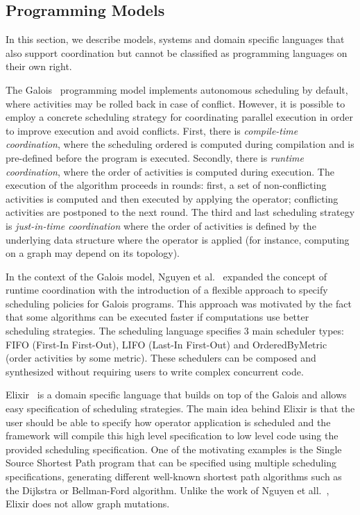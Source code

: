 \subsection{Programming Models}

In this section, we describe models, systems and domain specific languages that
also support coordination but cannot be classified as programming languages on
their own right.

The Galois~\cite{Pingali:2011:TPA:1993316.1993501} programming model implements
autonomous scheduling by default, where activities may be rolled back in case of
conflict. However, it is possible to employ a concrete scheduling strategy for
coordinating parallel execution in order to improve execution and avoid
conflicts.  First, there is \emph{compile-time coordination}, where the
scheduling ordered is computed during compilation and is pre-defined before the
program is executed. Secondly, there is \emph{runtime coordination}, where the
order of activities is computed during execution. The execution of the algorithm
proceeds in rounds: first, a set of non-conflicting activities is computed and
then executed by applying the operator; conflicting activities are postponed to
the next round. The third and last scheduling strategy is \emph{just-in-time
coordination} where the order of activities is defined by the underlying data
structure where the operator is applied (for instance, computing on a graph
may depend on its topology).

In the context of the Galois model, Nguyen et al.~\cite{nguyen11} expanded the
concept of runtime coordination with the introduction of a flexible approach to specify
scheduling policies for Galois programs. This approach was motivated by the fact
that some algorithms can be executed faster if computations use better
scheduling strategies. The scheduling language specifies 3 main scheduler types:
FIFO (First-In First-Out), LIFO (Last-In First-Out) and
OrderedByMetric (order activities by some metric). These schedulers can
be composed and synthesized without requiring users to write complex concurrent
code.

Elixir~\cite{Prountzos:2012:ESS:2384616.2384644} is a domain specific language
that builds on top of the Galois and allows easy specification of scheduling
strategies.  The main idea behind Elixir is that the user should be able to
specify how operator application is scheduled and the framework will compile
this high level specification to low level code using the provided scheduling
specification. One of the motivating examples is the Single Source Shortest Path
program that can be specified using multiple scheduling specifications,
generating different well-known shortest path algorithms such as the
Dijkstra or Bellman-Ford algorithm. Unlike the work of Nguyen et
all.~\cite{nguyen11}, Elixir does not allow graph mutations.

